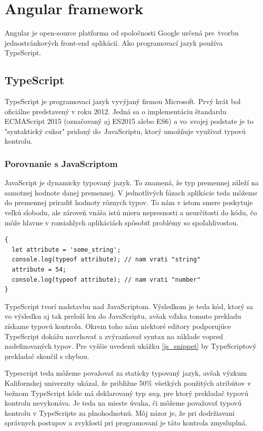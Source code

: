 \documentclass[
  printed, %
  twoside, %
  notable,   %
  nolof,   %
  nolot,   %
]{fithesis3}
\newcommand{\inquotes}[1]{{}"{}#1{}"{}}
\begin{document}
\chapter{Angular framework}
Angular je open-source platforma od spoločnosti Google určená pre~tvorbu jednostránkových front-end aplikácií. Ako programovací jazyk používa TypeScript.

\section{TypeScript}
TypeScript je programovací jazyk vyvýjaný firmou Microsoft. Prvý krát bol oficiálne predstavený v roku 2012. Jedná sa o implementáciu štandardu ECMAScript 2015 (označovaný aj ES2015 alebo ES6) a vo~svojej podstate je to \inquotes{syntaktický cukor} pridaný do~JavaScriptu, ktorý umožňuje využívať typovú kontrolu.

\subsection{Porovnanie s JavaScriptom}
JavaScript je dynamicky typovaný jazyk. To znamená, že typ premennej záleží na samotnej hodnote danej premennej. V jednotlivých fázach aplikácie teda môžeme do premennej priradiť hodnoty rôznych typov. To nám v istom smere poskytuje veľkú slobodu, ale zároveň vnáša istú mieru nepresnosti a neurčitosti do kódu, čo môže hlavne v rozsiahlych aplikáciách spôsobiť problémy so spoľahlivosťou.

\begin{lstlisting}[caption={Kód v JavaScripte},captionpos=b,label=js_snippet]
{
  let attribute = 'some_string';
  console.log(typeof attribute); // nam vrati "string"
  attribute = 54;
  console.log(typeof attribute); // nam vrati "number"
}
\end{lstlisting}

TypeScript tvorí nadstavbu nad JavaScriptom. Výsledkom je teda kód, ktorý sa vo výsledku aj tak preloží len do JavaScriptu, avšak vďaka tomuto prekladu získame typovú kontrolu. Okrem toho nám niektoré editory podporujúce TypeScript dokážu navrhovať a zvýrazňovať syntax na základe vopred nadefinovaných typov. Pre vyššie uvedenú ukážku \ref{js_snippet} by TypeScriptový prekladač skončil s chybou.

Typescript teda môžeme považovať za staticky typovaný jazyk, avšak výzkum Kalifornskej univerzity\cite{ray2014large} ukázal, že približne 50\% všetkých použitých atribútov v bežnom TypeScript kóde má deklarovaný typ \textit{any}, pre ktorý prekladač typovú kontrolu nevykonáva. Je teda na mieste úvaha, či môžeme považovať typovú kontrolu v TypeScripte za plnohodnotnú. Môj názor je, že pri dodržiavaní správnych postupov a zvyklostí pri programovaní je táto kontrola zmysluplná.
\end{document}
